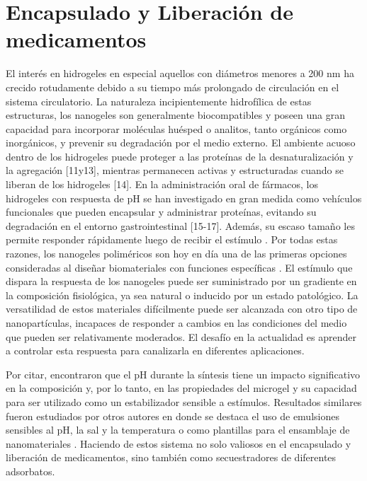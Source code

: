 \section{Encapsulado y Liberaci\'on de medicamentos}

El inter\'es en hidrogeles en especial aquellos con di\'ametros menores a 200 nm ha crecido rotudamente debido a su tiempo m\'as prolongado de circulaci\'on en el sistema circulatorio. La naturaleza incipientemente hidrof\'ilica de estas estructuras, los nanogeles son generalmente biocompatibles y poseen una gran capacidad para incorporar mol\'eculas hu\'esped o analitos, tanto org\'anicos como inorg\'anicos, y prevenir su degradaci\'on por el medio externo. El ambiente acuoso dentro de los hidrogeles puede proteger a las prote\'inas de la desnaturalización y la agregaci\'on [11y13], mientras permanecen activas y estructuradas cuando se liberan de los hidrogeles [14]. En la administraci\'on oral de f\'armacos, los hidrogeles con respuesta de pH se han investigado en gran medida como veh\'iculos funcionales que pueden encapsular y administrar prote\'inas, evitando su degradaci\'on en el entorno gastrointestinal [15-17].
Adem\'as, su escaso tama\~no les permite responder r\'apidamente luego de recibir el est\'imulo \cite{tanaka1979kinetics} . Por todas estas razones, los nanogeles polim\'ericos son hoy en d\'ia una de las primeras opciones consideradas al dise\~nar biomateriales con funciones espec\'ificas \cite{soni2016nanogels, sabir2019polymeric}. El est\'imulo que dispara la respuesta de los nanogeles puede ser suministrado por un gradiente en la composici\'on fisiol\'ogica, ya sea natural o inducido por un estado patol\'ogico. La versatilidad de estos materiales dif\'icilmente puede ser alcanzada con otro tipo de nanopart\'iculas, incapaces de responder a cambios en las condiciones del medio que pueden ser relativamente moderados. El desaf\'io en la actualidad es aprender a controlar esta respuesta para canalizarla en diferentes aplicaciones.


Por citar, \citet{Brugger2008} encontraron que el pH durante la s\'intesis tiene un impacto significativo en la composici\'on y, por lo tanto, en las propiedades del microgel y su capacidad para ser utilizado como un estabilizador sensible a est\'imulos.
Resultados similares fueron estudiados por otros autores en donde se destaca el uso de emulsiones sensibles al pH, la sal y la temperatura  \cite{Ngai2005,Ngai2006, Schmidt2011} o como plantillas para el ensamblaje de nanomateriales \cite{Wong2009}.
Haciendo de estos sistema no solo valiosos en el encapsulado y liberaci\'on de medicamentos, sino también como secuestradores de diferentes adsorbatos.

